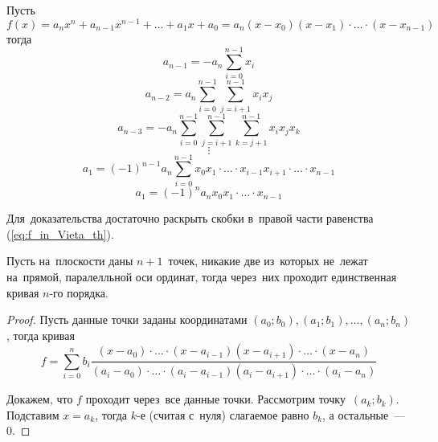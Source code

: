 \begin{theorem}[Виета]
Пусть 
\begin{equation}
\label{eq:f_in_Vieta_th}
f(x) = a_n x^n + a_{n-1} x^{n-1} + \ldots + a_1 x + a_0 = a_n(x - x_0)(x - x_1) \cdot \ldots \cdot (x - x_{n-1})
\end{equation}
тогда
\begin{equation*}
a_{n-1} = -a_n \sum_{i=0}^{n-1} x_i
\end{equation*}
\begin{equation*}
a_{n-2} = a_n \sum_{i=0}^{n-1} \sum_{j=i+1}^{n-1} x_i x_j
\end{equation*}
\begin{equation*}
a_{n-3} = -a_n \sum_{i=0}^{n-1} \sum_{j=i+1}^{n-1} \sum_{k=j+1}^{n-1} x_i x_j x_k
\end{equation*}
\begin{equation*}
\vdots
\end{equation*}
\begin{equation*}
a_1 = (-1)^{n-1} a_n \sum_{i=0}^{n-1} x_0 x_1 \cdot \ldots \cdot x_{i-1} x_{i+1} \cdot \ldots \cdot x_{n-1}
\end{equation*}
\begin{equation*}
a_1 = (-1)^n a_n x_0 x_1 \cdot \ldots \cdot x_{n-1}
\end{equation*}
\end{theorem}%
Для~доказательства достаточно раскрыть скобки в~правой части равенства (\ref{eq:f_in_Vieta_th}).

\begin{theorem}
Пусть на~плоскости даны $n + 1$~точек, никакие две из~которых не~лежат на~прямой, паралелльной оси ординат, тогда через~них проходит единственная кривая $n$\nobreakdash-го порядка.
\end{theorem}
\begin{proof}
Пусть данные точки заданы координатами $(a_0; b_0), (a_1; b_1), \ldots, (a_n; b_n)$, тогда кривая
\begin{equation*}
f = \sum_{i=0}^n b_i \frac
{(x - a_0) \cdot \ldots \cdot (x - a_{i-1})(x - a_{i+1}) \cdot \ldots \cdot (x - a_n)}
{(a_i - a_0) \cdot \ldots \cdot (a_i - a_{i-1})(a_i - a_{i+1}) \cdot \ldots \cdot (a_i - a_n)}
\end{equation*}

Докажем, что $f$ проходит через~все данные точки.
Рассмотрим точку~$(a_k; b_k)$.
Подставим $x = a_k$, тогда $k$\nobreakdash-е (считая с~нуля) слагаемое равно $b_k$, а остальные~--- 0.
\end{proof}